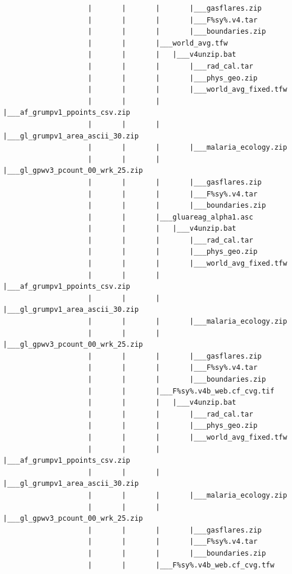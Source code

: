 \documentclass[]{book}
\begin{document}
\begin{verbatim}
                    |       |       |       |___gasflares.zip
                    |       |       |       |___F%sy%.v4.tar
                    |       |       |       |___boundaries.zip
                    |       |       |___world_avg.tfw
                    |       |       |   |___v4unzip.bat
                    |       |       |       |___rad_cal.tar
                    |       |       |       |___phys_geo.zip
                    |       |       |       |___world_avg_fixed.tfw
                    |       |       |       |___af_grumpv1_ppoints_csv.zip
                    |       |       |       |___gl_grumpv1_area_ascii_30.zip
                    |       |       |       |___malaria_ecology.zip
                    |       |       |       |___gl_gpwv3_pcount_00_wrk_25.zip
                    |       |       |       |___gasflares.zip
                    |       |       |       |___F%sy%.v4.tar
                    |       |       |       |___boundaries.zip
                    |       |       |___gluareag_alpha1.asc
                    |       |       |   |___v4unzip.bat
                    |       |       |       |___rad_cal.tar
                    |       |       |       |___phys_geo.zip
                    |       |       |       |___world_avg_fixed.tfw
                    |       |       |       |___af_grumpv1_ppoints_csv.zip
                    |       |       |       |___gl_grumpv1_area_ascii_30.zip
                    |       |       |       |___malaria_ecology.zip
                    |       |       |       |___gl_gpwv3_pcount_00_wrk_25.zip
                    |       |       |       |___gasflares.zip
                    |       |       |       |___F%sy%.v4.tar
                    |       |       |       |___boundaries.zip
                    |       |       |___F%sy%.v4b_web.cf_cvg.tif
                    |       |       |   |___v4unzip.bat
                    |       |       |       |___rad_cal.tar
                    |       |       |       |___phys_geo.zip
                    |       |       |       |___world_avg_fixed.tfw
                    |       |       |       |___af_grumpv1_ppoints_csv.zip
                    |       |       |       |___gl_grumpv1_area_ascii_30.zip
                    |       |       |       |___malaria_ecology.zip
                    |       |       |       |___gl_gpwv3_pcount_00_wrk_25.zip
                    |       |       |       |___gasflares.zip
                    |       |       |       |___F%sy%.v4.tar
                    |       |       |       |___boundaries.zip
                    |       |       |___F%sy%.v4b_web.cf_cvg.tfw

\end{verbatim}
\end{document}
